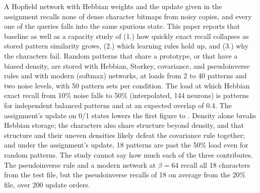 A Hopfield network with Hebbian weights and the update given in the assignment recalls none of  dense character bitmaps from noisy copies, and every one of the  queries falls into the same spurious state. This paper reports that baseline as well as a capacity study of (1.) how quickly exact recall collapses as stored pattern similarity grows, (2.) which learning rules hold up, and (3.) why the characters fail. Random patterns that share a prototype, or that have a biased density, are stored with Hebbian, Storkey, covariance, and pseudoinverse rules and with modern (softmax) networks, at loads from 2 to 40 patterns and two noise levels, with 50 pattern sets per condition. The load at which Hebbian exact recall from 10\% noise falls to 50\% (interpolated, 144 neurons) is  patterns for independent balanced patterns and  at an expected overlap of 0.4. The assignment's update on 0/1 states lowers the first figure to . Density alone breaks Hebbian storage; the characters also share structure beyond density, and that structure and their uneven densities likely defeat the covariance rule together; and under the assignment's update, 18 patterns are past the 50\% load even for random patterns. The study cannot say how much each of the three contributes. The pseudoinverse rule and a modern network at $\beta = 64$ recall all 18 characters from the test file, but the pseudoinverse recalls  of 18 on average from the 20\% file, over 200 update orders.

